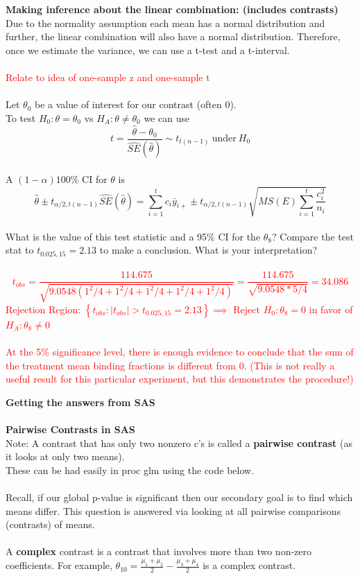 \Large\textbf{Making inference about the linear combination: (includes contrasts)}\large\\
Due to the normality assumption each mean has a normal distribution and further, the linear combination will also have a normal distribution.  Therefore, once we estimate the variance, we can use a t-test and a t-interval.\\~\\
\textcolor{red}{Relate to idea of one-sample z and one-sample t}\\~\\
Let $\theta_0$ be a value of interest for our contrast (often 0). \\
To test $H_{0}:\theta=\theta_{0}$ vs $H_{A}:\theta\neq \theta_{0}$ we can use
        $$t=\frac{\hat{\theta}-\theta_{0}}{\hat{SE}(\hat{\theta})}\sim t_{t(n-1)}~\text{under}~H_{0}$$~\\
				
A $(1-\alpha)100$\% CI for $\theta$ is
$$\hat{\theta}\pm t_{\alpha/2,t(n-1)}\hat{SE}(\hat{\theta}) = \sum_{i=1}^{t}c_{i}\bar{y}_{i+}\pm t_{\alpha/2,t(n-1)}\sqrt{MS(E)\sum_{i=1}^{t}\frac{c_{i}^2}{n_{i}}}$$~\\

What is the value of this test statistic and a 95\% CI for the $\theta_8$?  Compare the test stat to $t_{0.025,15}=2.13$ to make a conclusion.  What is your interpretation?\\~\\
\textcolor{red}{$$t_{obs}=\frac{114.675}{\sqrt{9.0548\left(1^2/4+1^2/4+1^2/4+1^2/4+1^2/4\right)}}=\frac{114.675}{\sqrt{9.0548*5/4}}=34.086$$
Rejection Region: $\left\{t_{obs}:|t_{obs}|>t_{0.025,15}=2.13\right\} \implies $ Reject $H_0:\theta_8=0$ in favor of $H_A:\theta_8\neq 0$\\~\\
At the 5\% significance level, there is enough evidence to conclude that the sum of the treatment mean binding fractions is different from 0.  (This is not really a useful result for this particular experiment, but this demonstrates the procedure!)}

\newpage

\Large \textbf{Getting the answers from SAS}\large\\~\\
\textbf{Pairwise Contrasts in SAS}\\
Note:  A contrast that has only two nonzero $c$'s is called a \textbf{pairwise contrast} (as it looks at only two means). \\ These can be had easily in proc glm using the code below.\\~\\
Recall, if our global p-value is significant then our secondary goal is to find which means differ.  This question is answered via looking at all pairwise comparisons (contrasts) of means.
\\~\\
A \textbf{complex} contrast is a contrast that involves more than two non-zero coefficients.  For example, $\theta_{10}=\frac{\mu_{1}+\mu_{2}}{2}-\frac{\mu_{3}+\mu_{4}}{2}$ is a complex contrast.  \\~\\


